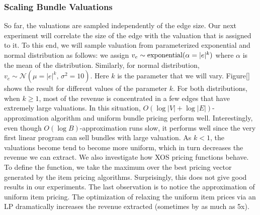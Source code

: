 \subsubsection{Scaling Bundle Valuations} So far, the valuations are sampled independently of the edge size. Our next experiment will correlate the size of the edge with the valuation that is assigned to it. To this end, we will sample valuation from parameterized exponential and normal distribution as follows: we assign $v_e \sim {\rm exponential}(\alpha = |e|^k)$ where $\alpha$ is the mean of the distribution. Similarly, for normal distribution, $v_e \sim \mathcal{N}(\mu = |e|^k,\, \sigma^2 = 10)$. Here $k$ is the parameter that we will vary. Figure[] shows the result for different values of the parameter $k$. For both distributions, when $k \geq 1$, most of the revenue is concentrated in a few edges that have extremely large valuations. In this situation, $O(\log |V| + \log |E|)$-approximation algorithm and uniform bundle pricing perform well. Interestingly, even though $O(\log B)$-approximation runs slow, it performs well since the very first linear program can sell bundles with large valuation. As $k < 1$, the valuations become tend to become more uniform, which in turn decreases the revenue we can extract. We also investigate how XOS pricing functions behave. To define the function, we take the maximum over the best pricing vector generated by the item pricing algorithms. Surprisingly, this does not give good results in our experiments. The last observation is to notice the approximation of uniform item pricing. The optimization of relaxing the uniform item prices via an LP dramatically increases the revenue extracted (sometimes by as much as 5x).

